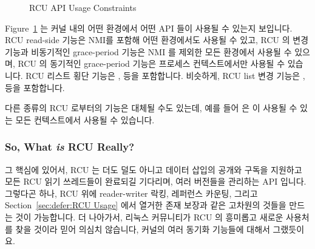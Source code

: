 \begin{figure}[tb]
\begin{center}
\end{center}
\caption{RCU API Usage Constraints}
\label{fig:defer:RCU API Usage Constraints}
\end{figure}

Figure~\ref{fig:defer:RCU API Usage Constraints}
는 커널 내의 어떤 환경에서 어떤 API 들이 사용될 수 있는지 보입니다.
RCU read-side 기능은 NMI를 포함해 어떤 환경에서도 사용될 수 있고, RCU 의 변경
기능과 비동기적인 grace-period 기능은 NMI 를 제외한 모든 환경에서 사용될 수
있으며, RCU 의 동기적인 grace-period 기능은 프로세스 컨텍스트에서만 사용될 수
있습니다.
RCU 리스트 횡단 기능은 ,
 등을 포함합니다.
비슷하게, RCU list 변경 기능은 ,  등을
포함합니다.

다른 종류의 RCU 로부터의 기능은 대체될 수도 있는데, 예를 들어
 은  이 사용될 수 있는 모든
컨텍스트에서 사용될 수 있습니다.

\subsubsection{So, What \emph{is} RCU Really?}
\label{sec:defer:So, What is RCU Really?}

그 핵심에 있어서, RCU 는 더도 덜도 아니고 데이터 삽입의 공개와 구독을 지원하고
모든 RCU 읽기 쓰레드들이 완료되길 기다리며, 여러 버전들을 관리하는 API 입니다.
그렇다곤 하나, RCU 위에 reader-writer 락킹, 레퍼런스 카운팅, 그리고
Section~\ref{sec:defer:RCU Usage} 에서 열거한 존재 보장과 같은 고차원의 것들을
만드는 것이 가능합니다.
더 나아가서, 리눅스 커뮤니티가 RCU 의 흥미롭고 새로운 사용처를 찾을 것이라 믿어
의심치 않습니다, 커널의 여러 동기화 기능들에 대해서 그랬듯이요.

